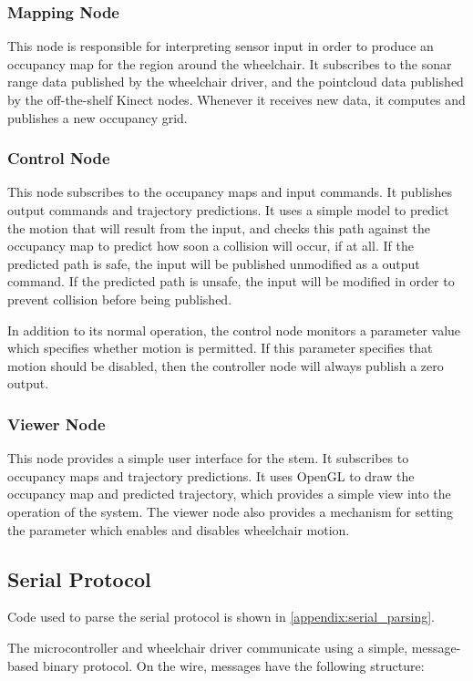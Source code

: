 \documentclass[oneside,final,a4paper]{report}
\begin{document}
\subsubsection{Mapping Node} 
This node is responsible for interpreting sensor input in order to produce an occupancy map for the region around the wheelchair.  It subscribes to the sonar range data published by the wheelchair driver, and the pointcloud data published by the off-the-shelf Kinect nodes.  Whenever it receives new data, it computes and publishes a new occupancy grid.

\subsubsection{Control Node}
This node subscribes to the occupancy maps and input commands.  It publishes output commands and trajectory predictions.  It uses a simple model to predict the motion that will result from the input, and checks this path against the occupancy map to predict how soon a collision will occur, if at all.  If the predicted path is safe, the input will be published unmodified as a output command.  If the predicted path is unsafe, the input will be modified in order to prevent collision before being published.

In addition to its normal operation, the control node monitors a parameter value which specifies whether motion is permitted.  If this parameter specifies that motion should be disabled, then the controller node will always publish a zero output.

\subsubsection{Viewer Node}
This node provides a simple user interface for the stem.  It subscribes to occupancy maps and trajectory predictions.  It uses OpenGL to draw the occupancy map and predicted trajectory, which provides a simple view into the operation of the system.  The viewer node also provides a mechanism for setting the parameter which enables and disables wheelchair motion.

\subsection{Serial Protocol}
Code used to parse the serial protocol is shown in \ref{appendix:serial_parsing}.

The microcontroller and wheelchair driver communicate using a simple, message-based binary protocol.  On the wire, messages have the following structure:
\end{document}
